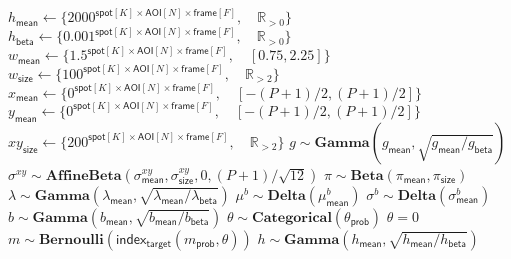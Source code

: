 \begin{algorithm}
\begin{algorithmic}[1]
{    $h_\mathsf{mean} \gets \{ 2000^{\mathsf{spot}[K] \times \mathsf{AOI}[N] \times \mathsf{frame}[F]}, \quad \mathbb{R}_{>0} \} $ \\
    $h_\mathsf{beta} \gets \{ 0.001^{\mathsf{spot}[K] \times \mathsf{AOI}[N] \times \mathsf{frame}[F]}, \quad \mathbb{R}_{>0} \} $ \\
    $w_\mathsf{mean} \gets \{ 1.5^{\mathsf{spot}[K] \times \mathsf{AOI}[N] \times \mathsf{frame}[F]}, \quad [0.75, 2.25] \} $ \\
    $w_\mathsf{size} \gets \{ 100^{\mathsf{spot}[K] \times \mathsf{AOI}[N] \times \mathsf{frame}[F]}, \quad \mathbb{R}_{>2} \} $ \\
    $x_\mathsf{mean} \gets \{ 0^{\mathsf{spot}[K] \times \mathsf{AOI}[N] \times \mathsf{frame}[F]}, \quad [-(P+1)/2, (P+1)/2] \} $ \\
    $y_\mathsf{mean} \gets \{ 0^{\mathsf{spot}[K] \times \mathsf{AOI}[N] \times \mathsf{frame}[F]}, \quad [-(P+1)/2, (P+1)/2] \} $ \\
    $xy_\mathsf{size} \gets \{ 200^{\mathsf{spot}[K] \times \mathsf{AOI}[N] \times \mathsf{frame}[F]}, \quad \mathbb{R}_{>2} \} $ }
\State $g \sim \mathbf{Gamma}(g_\mathsf{mean}, \sqrt{g_\mathsf{mean} / g_\mathsf{beta}})$
\State $\sigma^{xy} \sim \mathbf{AffineBeta}(\sigma^{xy}_\mathsf{mean}, \sigma^{xy}_\mathsf{size}, 0, (P+1) / \sqrt{12})$
\State $\pi \sim \mathbf{Beta}(\pi_\mathsf{mean}, \pi_\mathsf{size})$
\State $\lambda \sim \mathbf{Gamma}(\lambda_\mathsf{mean}, \sqrt{\lambda_\mathsf{mean} / \lambda_\mathsf{beta}})$
    \State $\mu^b \sim \mathbf{Delta}(\mu^b_\mathsf{mean})$
    \State $\sigma^b \sim \mathbf{Delta}(\sigma^b_\mathsf{mean})$
        \State $b \sim \mathbf{Gamma}(b_\mathsf{mean}, \sqrt{b_\mathsf{mean} / b_\mathsf{beta}})$
            \State $\theta \sim \mathbf{Categorical}\left( \theta_\mathsf{prob} \right)$
            \State $\theta = 0$
        \EndIf
            \State $m \sim \mathbf{Bernoulli}(\mathsf{index}_\mathsf{target} (m_\mathsf{prob}, \theta))$
                \State $h \sim \mathbf{Gamma}(h_\mathsf{mean}, \sqrt{h_\mathsf{mean} / h_\mathsf{beta}})$

\end{algorithmic}
\end{algorithm}
